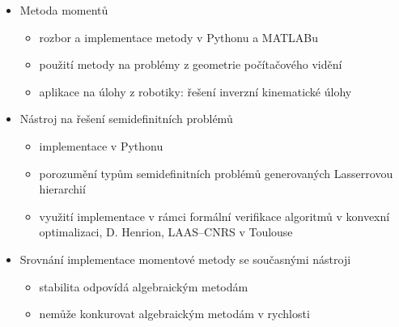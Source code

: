 \documentclass[cmpiitalkstyle, 22pt]{cmptalk}
\begin{document}
\begin{cmptalkslide}
  \begin{itemize}
    \item Metoda momentů
    \begin{itemize}
      \item rozbor a implementace metody v Pythonu a MATLABu
      \item použití metody na problémy z geometrie počítačového vidění
      \item aplikace na úlohy z robotiky: řešení inverzní kinematické úlohy
    \end{itemize}
    \item Nástroj na řešení semidefinitních problémů
    \begin{itemize}
      \item implementace v Pythonu
      \item porozumění typům semidefinitních problémů generovaných Lasserrovou hierarchií
      \item využití implementace v rámci formální verifikace algoritmů v konvexní optimalizaci, D. Henrion, LAAS--CNRS v Toulouse
    \end{itemize}
    \item Srovnání implementace momentové metody se současnými nástroji
    \begin{itemize}
      \item stabilita odpovídá algebraickým metodám
      \item nemůže konkurovat algebraickým metodám v rychlosti
    \end{itemize}
  \end{itemize}

\end{cmptalkslide}

\end{document}
